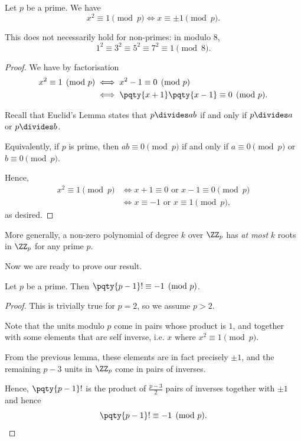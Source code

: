 \begin{lemma}
    Let \(p\) be a prime. We have
    \[
        x^2 \equiv 1 \pmod{p} \iff x \equiv \pm 1 \pmod{p}.
    \]
\end{lemma}

\begin{remark}
    This does not necessarily hold for non-primes: in modulo \(8\),
    \[
        1^2 \equiv 3^2 \equiv 5^2 \equiv 7^2 \equiv 1 \pmod{8}.
    \]
\end{remark}

\begin{proof}
    We have by factorisation
    \begin{align*}
        x^2 \equiv 1 \pmod{p} &\iff x^2 - 1 \equiv 0 \pmod{p} \\
        &\iff \pqty{x + 1} \pqty{x - 1} \equiv 0 \pmod{p}.
    \end{align*}

    Recall that Euclid's Lemma states that \(p \divides ab\) if and only if \(p \divides a\) or \(p \divides b\).

    Equivalently, if \(p\) is prime, then \(ab \equiv 0 \pmod{p}\) if and only if \(a \equiv 0 \pmod{p}\) or \(b \equiv 0 \pmod{p}\).

    Hence,
    \begin{align*}
        x^2 \equiv 1 \pmod{p} &\iff x + 1 \equiv 0 \text{ or } x - 1 \equiv 0 \pmod{p} \\
        &\iff x \equiv -1 \text{ or } x \equiv 1 \pmod{p},
    \end{align*}
    as desired.
\end{proof}

\begin{remark}
    More generally, a non-zero polynomial of degree \(k\) over \(\ZZ_p\) has \emph{at most} \(k\) roots in \(\ZZ_p\) for any prime \(p\).
\end{remark}

Now we are ready to prove our result.

\begin{theorem}
    Let \(p\) be a prime. Then \(\pqty{p - 1}! \equiv -1 \pmod{p}\).
\end{theorem}

\begin{proof}
    This is trivially true for \(p = 2\), so we assume \(p > 2\).

    Note that the units modulo \(p\) come in pairs whose product is \(1\), and together with some elements that are self inverse, i.e. \(x\) where \(x^2 \equiv 1 \pmod{p}\).

    From the previous lemma, these elements are in fact precisely \(\pm 1\), and the remaining \(p - 3\) units in \(\ZZ_p\) come in pairs of inverses.

    Hence, \(\pqty{p - 1}!\) is the product of \(\frac{p - 3}{2}\) pairs of inverses together with \(\pm 1\) and hence
    \[
        \pqty{p - 1}! \equiv -1 \pmod{p}.
    \]
\end{proof}

